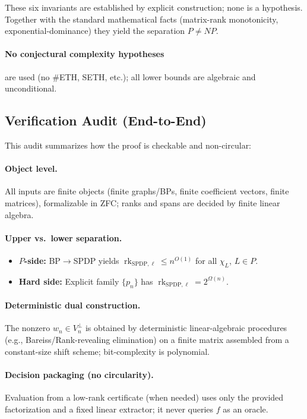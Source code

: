 \documentclass[12pt]{article}
\theoremstyle{definition}
\theoremstyle{definition}
\theoremstyle{remark}
\theoremstyle{remark}
\begin{document}
\noindent
These six invariants are established by explicit construction; none is a
hypothesis.  Together with the standard mathematical facts (matrix-rank
monotonicity, exponential-dominance) they yield the separation
$P \ne NP$.

\paragraph{No conjectural complexity hypotheses} are used (no \#ETH, SETH, etc.);
all lower bounds are algebraic and unconditional.

\subsection{Verification Audit (End-to-End)}

This audit summarizes how the proof is checkable and non-circular:

\paragraph{Object level.}
All inputs are finite objects (finite graphs/BPs, finite coefficient vectors, finite matrices), formalizable in ZFC; ranks and spans are decided by finite linear algebra.

\paragraph{Upper vs.\ lower separation.}
\begin{itemize}
\item \textbf{$P$-side:} BP$\to$SPDP yields $\operatorname{rk}_{\mathrm{SPDP},\ell}\le n^{O(1)}$ for all $\chi_L$, $L\in P$.
\item \textbf{Hard side:} Explicit family $\{p_n\}$ has $\operatorname{rk}_{\mathrm{SPDP},\ell}=2^{\Omega(n)}$.
\end{itemize}

\paragraph{Deterministic dual construction.}
The nonzero $w_n\in V_n^{\perp}$ is obtained by deterministic linear-algebraic procedures (e.g., Bareiss/Rank-revealing elimination) on a finite matrix assembled from a constant-size shift scheme; bit-complexity is polynomial.

\paragraph{Decision packaging (no circularity).}
Evaluation from a low-rank certificate (when needed) uses only the provided factorization and a fixed linear extractor; it never queries $f$ as an oracle.
\end{document}
